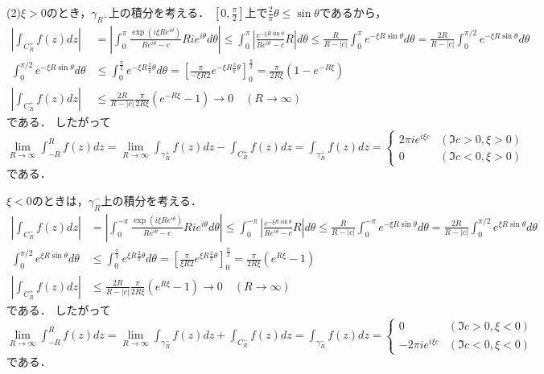 \documentclass[
		book,
		head_space=20mm,
		foot_space=20mm,
		gutter=10mm,
		line_length=190mm
]{jlreq}
\begin{document}
(2)$\xi>0$のとき，$\gamma_{R^+}$上の積分を考える．
$[0,\frac{\pi}{2}]$上で$\frac{2}{\pi}\theta\le\sin \theta$であるから，
\begin{align}
	\left| \int_{C_R^+}f(z)dz \right|&=\left| \int_{0}^{\pi} \frac{\exp(i\xi Re^{i\theta})}{Re^{i\theta}-c}Rie^{i\theta} d\theta\right|\le \int_0^\pi\left| \frac{e^{-\xi R\sin \theta}}{Re^{i\theta}-c}R \right|d\theta\le \frac{R}{R-|c|}\int_0^\pi e^{-\xi R\sin \theta}d\theta=\frac{2R}{R-|c|}\int_0^{\pi/2} e^{-\xi R\sin \theta}d\theta\\
	\int_0^{\pi/2} e^{-\xi R\sin \theta}d\theta&\le \int_0^{\frac{\pi}{2}}e^{-\xi R \frac{2}{\pi}\theta}d\theta=\left[ \frac{\pi}{-\xi R 2}e^{-\xi R \frac{2}{\pi}\theta} \right]_0^{\frac{\pi}{2}}=\frac{\pi}{2R\xi}(1-e^{-R\xi})\\
	\left| \int_{C_R^+}f(z)dz \right|&\le \frac{2R}{R-|c|}\frac{\pi}{2R\xi}(e^{-R\xi}-1)\rightarrow 0\quad(R\to \infty)
\end{align}である．
したがって$\lim\limits_{R\to \infty} \int_{-R}^R f(z)dz=\lim\limits_{R\to \infty} \int_{\gamma_R^+} f(z)dz-\int_{C_R^+}f(z)dz=\int_{\gamma_R^+} f(z)dz=\begin{cases}
	2\pi i e^{i\xi c}&(\Im c>0,\xi>0)\\
	0&(\Im c<0,\xi>0)
\end{cases}$である．

$\xi<0$のときは，$\gamma_R^-$上の積分を考える．
\begin{align}
	\left| \int_{C_R^-}f(z)dz \right|&=\left| \int_{0}^{-\pi} \frac{\exp(i\xi Re^{i\theta})}{Re^{i\theta}-c}Rie^{i\theta} d\theta\right|\le \int_0^{-\pi}\left| \frac{e^{-\xi R\sin \theta}}{Re^{i\theta}-c}R \right|d\theta\le \frac{R}{R-|c|}\int_0^{-\pi} e^{-\xi R\sin \theta}d\theta=\frac{2R}{R-|c|}\int_0^{\pi/2} e^{\xi R\sin \theta}d\theta\\
	\int_0^{\pi/2} e^{\xi R\sin \theta}d\theta&\le \int_0^{\frac{\pi}{2}}e^{\xi R \frac{2}{\pi}\theta}d\theta=\left[ \frac{\pi}{\xi R 2}e^{\xi R \frac{2}{\pi}\theta} \right]_0^{\frac{\pi}{2}}=\frac{\pi}{2R\xi}(e^{R\xi}-1)\\
	\left| \int_{C_R^+}f(z)dz \right|&\le \frac{2R}{R-|c|}\frac{\pi}{2R\xi}(e^{R\xi}-1)\rightarrow 0\quad(R\to \infty)
\end{align}である．
したがって$\lim\limits_{R\to \infty} \int_{-R}^R f(z)dz=\lim\limits_{R\to \infty} \int_{\gamma_R^-} f(z)dz+\int_{C_R^-}f(z)dz=\int_{\gamma_R^-} f(z)dz=\begin{cases}
	0&(\Im c>0,\xi<0)\\
	-2\pi i e^{i\xi c}&(\Im c<0,\xi<0)
\end{cases}$である．
\end{document}
